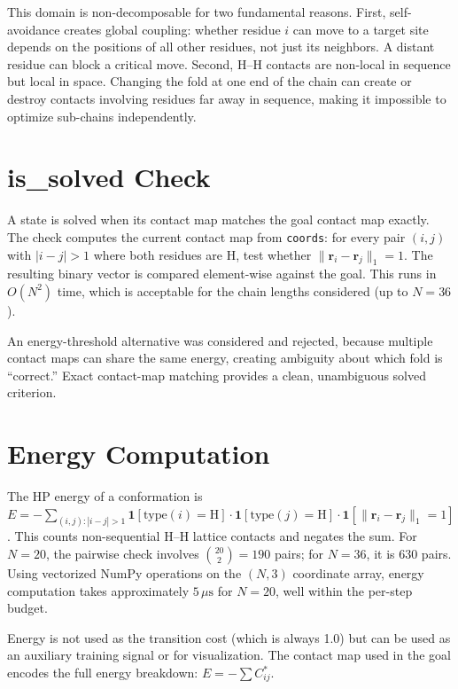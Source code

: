 \documentclass[11pt]{article}
\begin{document}
This domain is non-decomposable for two fundamental reasons. First, self-avoidance creates global coupling: whether residue $i$ can move to a target site depends on the positions of all other residues, not just its neighbors. A distant residue can block a critical move. Second, H--H contacts are non-local in sequence but local in space. Changing the fold at one end of the chain can create or destroy contacts involving residues far away in sequence, making it impossible to optimize sub-chains independently.


\section{is\_solved Check}

A state is solved when its contact map matches the goal contact map exactly. The check computes the current contact map from \texttt{coords}: for every pair $(i, j)$ with $|i - j| > 1$ where both residues are H, test whether $\|\mathbf{r}_i - \mathbf{r}_j\|_1 = 1$. The resulting binary vector is compared element-wise against the goal. This runs in $O(N^2)$ time, which is acceptable for the chain lengths considered (up to $N = 36$).

An energy-threshold alternative was considered and rejected, because multiple contact maps can share the same energy, creating ambiguity about which fold is ``correct.'' Exact contact-map matching provides a clean, unambiguous solved criterion.


\section{Energy Computation}

The HP energy of a conformation is $E = -\sum_{(i,j): |i-j|>1} \mathbf{1}[\text{type}(i) = \text{H}] \cdot \mathbf{1}[\text{type}(j) = \text{H}] \cdot \mathbf{1}[\|\mathbf{r}_i - \mathbf{r}_j\|_1 = 1]$. This counts non-sequential H--H lattice contacts and negates the sum. For $N = 20$, the pairwise check involves $\binom{20}{2} = 190$ pairs; for $N = 36$, it is 630 pairs. Using vectorized NumPy operations on the $(N, 3)$ coordinate array, energy computation takes approximately $5\,\mu\text{s}$ for $N = 20$, well within the per-step budget.

Energy is not used as the transition cost (which is always 1.0) but can be used as an auxiliary training signal or for visualization. The contact map used in the goal encodes the full energy breakdown: $E = -\sum C^*_{ij}$.
\end{document}
